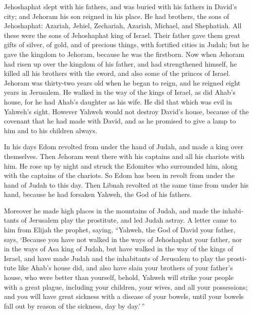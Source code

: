 \begin{paracol}{2}
\begin{otherlanguage}{english}
 Jehoshaphat slept with his fathers, and was buried with
his fathers in David's city; and Jehoram his son reigned in his place.
 He had brothers, the sons of Jehoshaphat: Azariah,
Jehiel, Zechariah, Azariah, Michael, and Shephatiah. All these were the
sons of Jehoshaphat king of Israel.  Their father gave
them great gifts of silver, of gold, and of precious things, with
fortified cities in Judah; but he gave the kingdom to Jehoram, because
he was the firstborn.  Now when Jehoram had risen up over
the kingdom of his father, and had strengthened himself, he killed all
his brothers with the sword, and also some of the princes of Israel.
 Jehoram was thirty-two years old when he began to reign,
and he reigned eight years in Jerusalem.  He walked in the
way of the kings of Israel, as did Ahab's house, for he had Ahab's
daughter as his wife. He did that which was evil in Yahweh's sight.
 However Yahweh would not destroy David's house, because
of the covenant that he had made with David, and as he promised to give
a lamp to him and to his children always.

 In his days Edom revolted from under the hand of Judah,
and made a king over themselves.  Then Jehoram went there
with his captains and all his chariots with him. He rose up by night and
struck the Edomites who surrounded him, along with the captains of the
chariots.  So Edom has been in revolt from under the hand
of Judah to this day. Then Libnah revolted at the same time from under
his hand, because he had forsaken Yahweh, the God of his fathers.

 Moreover he made high places in the mountains of Judah,
and made the inhabitants of Jerusalem play the prostitute, and led Judah
astray.  A letter came to him from Elijah the prophet,
saying, ``Yahweh, the God of David your father, says, `Because you have
not walked in the ways of Jehoshaphat your father, nor in the ways of
Asa king of Judah,  but have walked in the way of the
kings of Israel, and have made Judah and the inhabitants of Jerusalem to
play the prostitute like Ahab's house did, and also have slain your
brothers of your father's house, who were better than yourself,
 behold, Yahweh will strike your people with a great
plague, including your children, your wives, and all your possessions;
 and you will have great sickness with a disease of your
bowels, until your bowels fall out by reason of the sickness, day by
day.'\,''


\end{otherlanguage}
\end{paracol}
